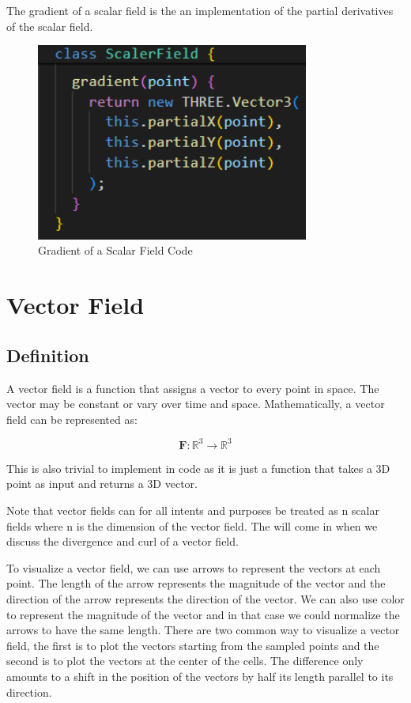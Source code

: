 \documentclass[12pt]{article}
\begin{document}
The gradient of a scalar field is the an implementation of the partial derivatives of the scalar field.

\begin{figure}[H]
    \centering
    \includegraphics[width=0.8\textwidth]{images/grad.png}
    \caption{Gradient of a Scalar Field Code\cite{El-Deeb_PEU-218_Stokes_Threejs}}
\end{figure}

\newpage
\section{Vector Field}
\subsection{Definition}

A vector field is a function that assigns a vector to every point in space. The vector may be constant or vary over time and space. Mathematically, a vector field can be represented as:

\[
    \mathbf{F}: \mathbb{R}^3 \rightarrow \mathbb{R}^3
\]

This is also trivial to implement in code as it is just a function that takes a 3D point as input and returns a 3D vector.

Note that vector fields can for all intents and purposes be treated as n scalar fields where n is the dimension of the vector field. The will come in when we discuss the divergence and curl of a vector field.

To visualize a vector field, we can use arrows to represent the vectors at each point. The length of the arrow represents the magnitude of the vector and the direction of the arrow represents the direction of the vector. We can also use color to represent the magnitude of the vector and in that case we could normalize the arrows to have the same length.
There are two common way to visualize a vector field, the first is to plot the vectors starting from the sampled points and the second is to plot the vectors at the center of the cells.
The difference only amounts to a shift in the position of the vectors by half its length parallel to its direction.
\end{document}
